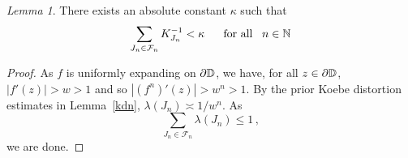 \documentclass[11pt,reqno]{amsart}
\newcommand{\N}{{\Bbb N}}
\newcommand{\D}{{\Bbb D}}
\newcommand{\0}{\mathbf{0}}
\newtheorem{lemma}{Lemma}
\theoremstyle{remark}
\numberwithin{equation}{section}
\newtheorem{lemma}[theorem]{Lemma}
\theoremstyle{remark}
\numberwithin{equation}{section}
\begin{document}
\begin{lemma}\label{lcondsum}
There exists an absolute constant $\kappa$ such that 
    \begin{eqnarray}\label{condsum}
        \sum_{J_n \in \mathcal{F}_n}K_{J_n}^{-1} < \kappa \quad \text{ \ for all \ } \,  n \in \N
    \end{eqnarray}
\end{lemma}
\begin{proof}
 As $f$ is uniformly expanding on $\partial \D$, we have, for all $z \in \partial \D$, $|f'(z)|>w>1$ and so $ |(f^n)'(z)|>w^n>1$. By the prior Koebe distortion estimates in Lemma~\ref{kdn}, $\lambda(J_n) \asymp 1/w^n$. As $$\sum_{J_n \in \mathcal{F}_n} \lambda(J_n) \leq 1 \, ,$$ we are done.
\end{proof}


\medskip
\end{document}
